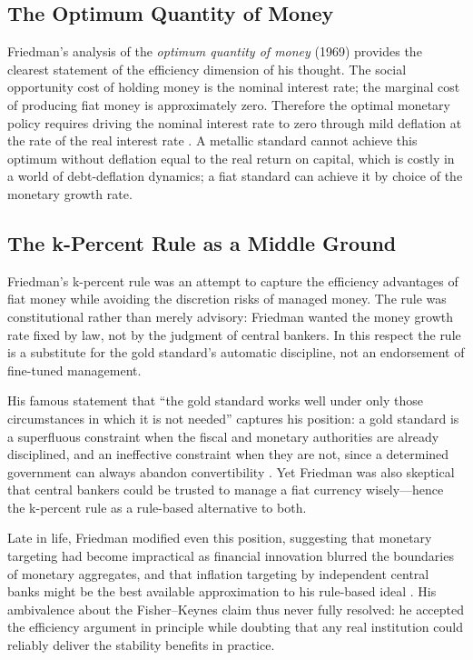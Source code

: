 \documentclass[12pt]{article}
\begin{document}
\subsection{The Optimum Quantity of Money}

Friedman's analysis of the \textit{optimum quantity of money}
(1969) provides the clearest statement of the efficiency dimension
of his thought.  The social opportunity cost of holding money is
the nominal interest rate; the marginal cost of producing fiat
money is approximately zero.  Therefore the optimal monetary
policy requires driving the nominal interest rate to zero through
mild deflation at the rate of the real interest rate
\citep{Friedman1969}.  A metallic standard cannot achieve this
optimum without deflation equal to the real return on capital,
which is costly in a world of debt-deflation dynamics; a fiat
standard can achieve it by choice of the monetary growth rate.

\subsection{The k-Percent Rule as a Middle Ground}

Friedman's k-percent rule was an attempt to capture the
efficiency advantages of fiat money while avoiding the discretion
risks of managed money.  The rule was constitutional rather than
merely advisory: Friedman wanted the money growth rate fixed by
law, not by the judgment of central bankers.  In this respect
the rule is a substitute for the gold standard's automatic
discipline, not an endorsement of fine-tuned management.

His famous statement that ``the gold standard works
well under only those circumstances in which it is not needed''
captures his position: a gold standard is a superfluous constraint
when the fiscal and monetary authorities are already disciplined,
and an ineffective constraint when they are not, since a
determined government can always abandon convertibility
\citep{Friedman1962}.  Yet Friedman was also skeptical that
central bankers could be trusted to manage a fiat currency
wisely---hence the k-percent rule as a rule-based alternative
to both.

Late in life, Friedman modified even this position, suggesting
that monetary targeting had become impractical as financial
innovation blurred the boundaries of monetary aggregates, and
that inflation targeting by independent central banks might be
the best available approximation to his rule-based ideal
\citep{Friedman2003}.  His ambivalence about the Fisher--Keynes
claim thus never fully resolved: he accepted the efficiency
argument in principle while doubting that any real institution
could reliably deliver the stability benefits in practice.
\end{document}
